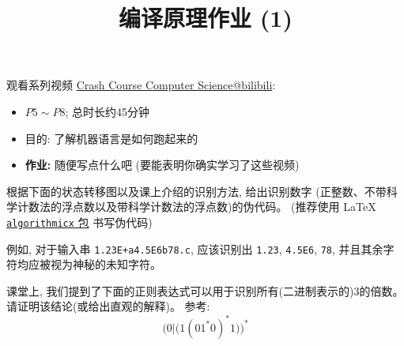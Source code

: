 \documentclass[a4paper, justified]{tufte-handout}
\title{编译原理作业 (1)}
\date{\zhtoday}
\begin{document}
\maketitle
\noplagiarism %
\begin{abstract}
\end{abstract}
\beginrequired
\begin{problem}
  观看系列视频 \href{https://www.bilibili.com/video/BV1EW411u7th?}{Crash Course Computer Science@bilibili}:
  \begin{itemize}
    \item $P5 \sim P8$; 总时长约45分钟
    \item 目的: 了解机器语言是如何跑起来的
    \item {\bf 作业:} 随便写点什么吧 (要能表明你确实学习了这些视频)
  \end{itemize}
\end{problem}

\begin{solution}
\end{solution}

\begin{problem}
  根据下面的状态转移图以及课上介绍的识别方法, 给出识别数字
  (正整数、不带科学计数法的浮点数以及带科学计数法的浮点数)的伪代码。
  (推荐使用 \LaTeX{} 
  \href{http://tug.ctan.org/macros/latex/contrib/algorithmicx/algorithmicx.pdf}{\texttt{algorithmicx} 包}
  书写伪代码)


  例如, 对于输入串 \texttt{1.23E+a4.5E6b78.c}, 
  应该识别出 \texttt{1.23}, \texttt{4.5E6}, \texttt{78},
  并且其余字符均应被视为神秘的未知字符。
\end{problem}

\begin{solution}
\end{solution}

\begin{problem}
  课堂上, 我们提到了下面的正则表达式可以用于识别所有(二进制表示的)3的倍数。
  请证明该结论(或给出直观的解释)。
  参考: 
  \[ 
    \Big(0|\big(1(01^{\ast}0)^{\ast}1\big)\Big)^{\ast} 
  \]
\end{problem}
\end{document}

